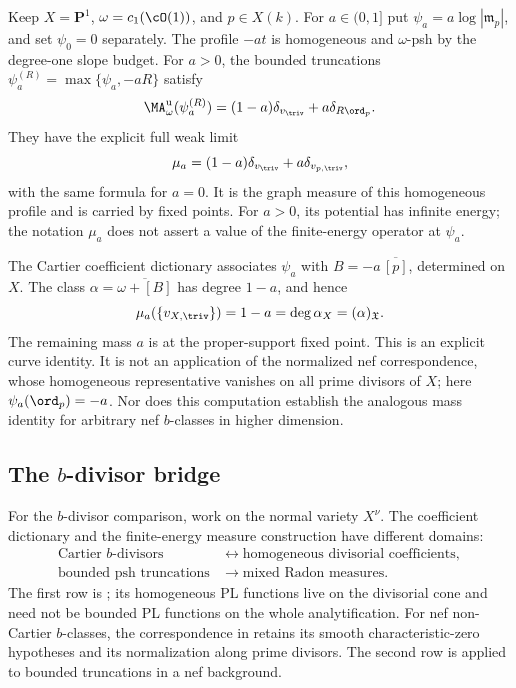 \begin{example}
\label{ex:ch46-homogeneous-curve-bdivisor}
Keep $X=\mathbf P^1$, $\omega=c_1(\cO(1))$, and $p\in X(k)$.
For $a\in(0,1]$ put $\psi_a=a\log|\mathfrak m_p|$, and set
$\psi_0=0$ separately. The profile $-at$ is homogeneous and
$\omega$-psh by the degree-one slope budget.
For $a>0$, the bounded truncations
$\psi_a^{(R)}=\max\{\psi_a,-aR\}$ satisfy
\[
 \MA^{\mathrm u}_\omega(\psi_a^{(R)})
    =(1-a)\delta_{v_{\triv}}+a\delta_{R\ord_p}.
\]
They have the explicit full weak limit
\[
 \mu_a=(1-a)\delta_{v_{\triv}}+a\delta_{v_{p,\triv}},
\]
with the same formula for $a=0$. It is the graph measure of this
homogeneous profile and is carried by fixed points. For $a>0$, its
potential has infinite energy; the notation $\mu_a$ does not assert a
value of the finite-energy operator at $\psi_a$.

The Cartier coefficient dictionary 
associates $\psi_a$ with $B=-a\,\overline{[p]}$, determined on $X$.
The class $\alpha=\overline{\omega+[B]}$ has degree $1-a$, and hence
\[
 \mu_a(\{v_{X,\triv}\})=1-a=\deg\alpha_X=(\alpha)_{\mathfrak X}.
\]
The remaining mass $a$ is at the proper-support fixed point.
This is an explicit curve identity. It is not an application of the
normalized nef correspondence, whose homogeneous representative vanishes
on all prime divisors of $X$; here $\psi_a(\ord_p)=-a$.
Nor does this computation establish the analogous mass identity for
arbitrary nef $b$-classes in higher dimension.
\end{example}

\subsection{The \texorpdfstring{$b$}{b}-divisor bridge}
\label{sec:ch46-bdivisor-bridge}

For the $b$-divisor comparison, work on the normal variety $X^\nu$.
The coefficient dictionary and the finite-energy measure construction
have different domains:
\[
 \begin{aligned}
  \text{Cartier $b$-divisors}
    &\longleftrightarrow\text{homogeneous divisorial coefficients},\\
  \text{bounded psh truncations}
    &\longrightarrow\text{mixed Radon measures}.
 \end{aligned}
\tag{46.28}\label{eq:bj-energy-homogeneous-dictionary}
\]
The first row is ; its homogeneous PL
functions live on the divisorial cone and need not be bounded PL functions
on the whole analytification. For nef non-Cartier $b$-classes, the
correspondence in  retains its
smooth characteristic-zero hypotheses and its normalization along prime
divisors. The second row is  applied to bounded
truncations in a nef background.

